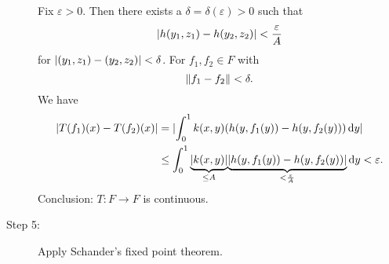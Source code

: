 \begin{beispiel}
\begin{description}
	Fix $\varepsilon >0$. Then there exists a $\delta = \delta (\varepsilon) >0$ such that
	\[
		\lvert h(y_1,z_1)-h(y_2,z_2)\rvert < \frac{\varepsilon}{A}
	\] 
	for $\lvert(y_1,z_1)-(y_2,z_2)\rvert < \delta $. For $f_1,f_2 \in F$ with
	\[
		\norm{f_1-f_2} < \delta.
	\]
	We have 
	\begin{align*}
		\lvert T(f_1)(x)-T(f_2)(x)\rvert &= \lvert\int_{0}^{1}k(x,y)(h(y,f_1(y))-h(y,f_2(y))) \,\mathrm{d}y\rvert \\
		&\leq  \int_{0}^{1}\underset{\leq A}{\underbrace{\lvert k(x,y)\rvert}}\underset{< \frac{\varepsilon}{A}}{\underbrace{\lvert h(y,f_1(y))-h(y,f_2(y))\rvert}} \,\mathrm{d}y < \varepsilon.
	\end{align*}
	Conclusion: $T: F \to F$ is continuous. 
	\item[Step 5:] Apply Schander's fixed point theorem.
	\end{description}
\end{beispiel}
